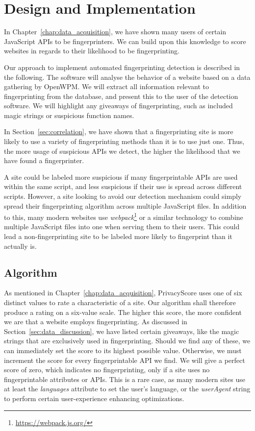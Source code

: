\documentclass[
    fontsize=12pt,
    headings=small,
    parskip=half,
    bibliography=totoc,
    numbers=noenddot,
    open=any
    ]{scrreprt}
\begin{document}
\chapter{Design and Implementation}
\label{chap:implementation}
In Chapter~\ref{chap:data_acquisition}, we have shown many users of certain JavaScript APIs to be fingerprinters.
We can build upon this knowledge to score websites in regards to their likelihood to be fingerprinting.

Our approach to implement automated fingerprinting detection is described in the following.
The software will analyse the behavior of a website based on a data gathering by OpenWPM.
We will extract all information relevant to fingerprinting from the database,
and present this to the user of the detection software.
We will highlight any giveaways of fingerprinting, such as included magic strings
or suspicious function names.

In Section~\ref{sec:correlation}, we have shown that a fingerprinting site is more
likely to use a variety of fingerprinting methods than it is to use just one.
Thus, the more usage of suspicious APIs we detect, the higher the likelihood
that we have found a fingerprinter.

A site could be labeled more suspicious if many fingerprintable APIs are used within the same script,
and less suspicious if their use is spread across different scripts.
However, a site looking to avoid our detection mechanism could simply
spread their fingerprinting algorithm across multiple JavaScript files.
In addition to this, many modern websites use \textit{webpack}\footnote{\url{https://webpack.js.org/}}
or a similar technology to combine multiple JavaScript files into one when serving
them to their users. This could lead a non-fingerprinting site to be labeled
more likely to fingerprint than it actually is.

\section{Algorithm}
As mentioned in Chapter~\ref{chap:data_acquisition}, PrivacyScore uses one of six distinct values
to rate a characteristic of a site. Our algorithm shall therefore produce a rating on a
six-value scale. The higher this score, the more confident we are that a website employs
fingerprinting. As discussed in Section~\ref{sec:data_discussion}, we have listed
certain giveaways, like the magic strings that are exclusively used in fingerprinting.
Should we find any of these, we can immediately set the score to its highest possible
value.
Otherwise, we must increment the score for every fingerprintable API we find.
We will give a perfect score of zero, which indicates no fingerprinting, only
if a site uses no fingerprintable attributes or APIs.
This is a rare case, as many modern sites use at least the \textit{languages}
attribute to set the user's language, or the \textit{userAgent} string to
perform certain user-experience enhancing optimizations.
\end{document}
